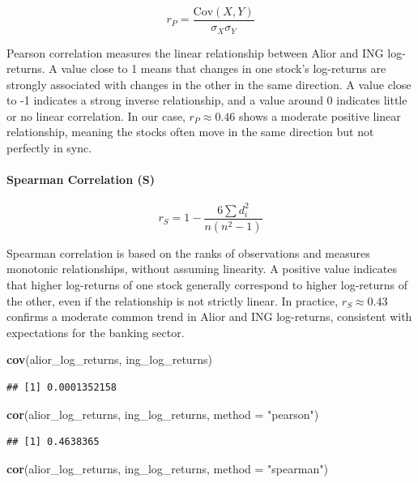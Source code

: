 \documentclass[
]{article}
\newenvironment{Shaded}{\begin{snugshade}}{\end{snugshade}}
\newcommand{\AttributeTok}[1]{\textcolor[rgb]{0.13,0.29,0.53}{#1}}
\newcommand{\FunctionTok}[1]{\textcolor[rgb]{0.13,0.29,0.53}{\textbf{#1}}}
\newcommand{\NormalTok}[1]{#1}
\newcommand{\StringTok}[1]{\textcolor[rgb]{0.31,0.60,0.02}{#1}}
\begin{document}
\[
r_P = \frac{\text{Cov}(X, Y)}{\sigma_X \sigma_Y}
\]

Pearson correlation measures the linear relationship between Alior and
ING log-returns. A value close to 1 means that changes in one stock's
log-returns are strongly associated with changes in the other in the
same direction. A value close to -1 indicates a strong inverse
relationship, and a value around 0 indicates little or no linear
correlation. In our case, \(r_P \approx 0.46\) shows a moderate positive
linear relationship, meaning the stocks often move in the same direction
but not perfectly in sync.

\paragraph{Spearman Correlation (S)}\label{spearman-correlation-s}

\[
r_S = 1 - \frac{6 \sum d_i^2}{n(n^2-1)}
\]

Spearman correlation is based on the ranks of observations and measures
monotonic relationships, without assuming linearity. A positive value
indicates that higher log-returns of one stock generally correspond to
higher log-returns of the other, even if the relationship is not
strictly linear. In practice, \(r_S \approx 0.43\) confirms a moderate
common trend in Alior and ING log-returns, consistent with expectations
for the banking sector.

\begin{Shaded}
\begin{Highlighting}[]
\FunctionTok{cov}\NormalTok{(alior\_log\_returns, ing\_log\_returns)}
\end{Highlighting}
\end{Shaded}

\begin{verbatim}
## [1] 0.0001352158
\end{verbatim}

\begin{Shaded}
\begin{Highlighting}[]
\FunctionTok{cor}\NormalTok{(alior\_log\_returns, ing\_log\_returns, }\AttributeTok{method =} \StringTok{"pearson"}\NormalTok{)}
\end{Highlighting}
\end{Shaded}

\begin{verbatim}
## [1] 0.4638365
\end{verbatim}

\begin{Shaded}
\begin{Highlighting}[]
\FunctionTok{cor}\NormalTok{(alior\_log\_returns, ing\_log\_returns, }\AttributeTok{method =} \StringTok{"spearman"}\NormalTok{)}
\end{Highlighting}
\end{Shaded}
\end{document}
